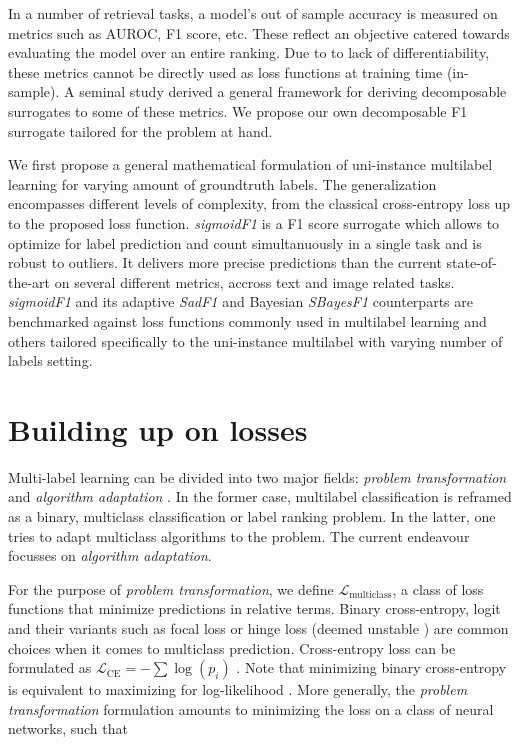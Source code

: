 \documentclass[sigconf,natbib,screen=true,review=true,anonymous]{acmart}
\begin{document}
In a number of retrieval tasks, a model's out of sample accuracy is measured on metrics such as AUROC, F1 score, etc. These reflect an objective catered towards evaluating the model over an entire ranking. Due to to lack of differentiability, these metrics cannot be directly used as loss functions at training time (in-sample). A seminal study \cite{optimizableLosses} derived a general framework for deriving decomposable surrogates to some of these metrics. We propose our own decomposable F1 surrogate tailored for the problem at hand.

We first propose a general mathematical formulation of uni-instance multilabel learning for varying amount of groundtruth labels. The generalization encompasses different levels of complexity, from the classical cross-entropy loss up to the proposed loss function. \emph{sigmoidF1} is a F1 score surrogate which allows to optimize for label prediction and count simultanuously in a single task and is robust to outliers. It delivers more precise predictions than the current state-of-the-art on several different metrics, accross text and image related tasks. \emph{sigmoidF1} and its adaptive \emph{SadF1} and Bayesian \emph{SBayesF1} counterparts are benchmarked against loss functions commonly used in multilabel learning and others tailored specifically to the uni-instance multilabel with varying number of labels setting.

\section{Building up on losses}
\label{sec:org8c910ea}

Multi-label learning can be divided into two major fields: \emph{problem transformation} and \emph{algorithm adaptation} \cite{multilabelReview}. In the former case, multilabel classification is reframed as a binary, multiclass classification or label ranking problem. In the latter, one tries to adapt multiclass algorithms to the problem. The current endeavour focusses on \emph{algorithm adaptation}.


For the purpose of \emph{problem transformation}, we define \(\mathcal{L}_{\text {multiclass}}\), a class of loss functions that minimize predictions in relative terms. Binary cross-entropy, logit and their variants such as focal loss or hinge loss (deemed unstable \cite{focalLoss}) are common choices when it comes to multiclass prediction. Cross-entropy loss can be formulated as \(\mathcal{L}_{\text {CE}}=-\sum \log \left(p_{i}\right)\) . Note that minimizing binary cross-entropy is equivalent to maximizing for log-likelihood \cite[Section 4.3.4]{Bishop}. More generally, the \emph{problem transformation} formulation amounts to minimizing the loss on a class of neural networks, such that
\end{document}
